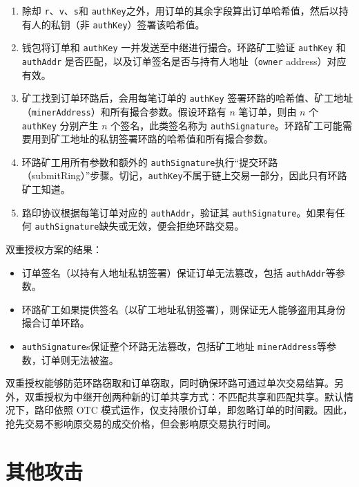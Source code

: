 \documentclass[UTF8,nofonts]{ctexart}%
\begin{document}
\begin{multicols}{2}
\begin{enumerate}
	\item 除却 \verb|r|、\verb|v|、\verb|s|和 \verb|authKey|之外，用订单的其余字段算出订单哈希值，然后以持有人的私钥（非 \verb|authKey|）签署该哈希值。

	\item 钱包将订单和 \verb|authKey| 一并发送至中继进行撮合。环路矿工验证 \verb|authKey| 和 \verb|authAddr| 是否匹配，以及订单签名是否与持有人地址（\verb|owner| address）对应有效。 

	\item 矿工找到订单环路后，会用每笔订单的 \verb|authKey| 签署环路的哈希值、矿工地址（\verb|minerAddress|）和所有撮合参数。假设环路有 $n$ 笔订单，则由 $n$ 个 \verb|authKey| 分别产生 $n$ 个签名，此类签名称为 \verb|authSignature|。环路矿工可能需要用到矿工地址的私钥签署环路的哈希值和所有撮合参数。

	\item 环路矿工用所有参数和额外的 \verb|authSignature|执行“提交环路（submitRing）”步骤。切记，\verb|authKey|不属于链上交易一部分，因此只有环路矿工知道。


	\item 路印协议根据每笔订单对应的 \verb|authAddr|，验证其 \verb|authSignature|。如果有任何 \verb|authSignature|缺失或无效，便会拒绝环路交易。
 
\end{enumerate}

双重授权方案的结果：

\begin{itemize}

	\item  订单签名（以持有人地址私钥签署）保证订单无法篡改，包括 \verb|authAddr|等参数。
	\item  环路矿工如果提供签名（以矿工地址私钥签署），则保证无人能够盗用其身份撮合订单环路。
	\item  \verb|authSignature|s保证整个环路无法篡改，包括矿工地址 \verb|minerAddress|等参数，订单则无法被盗。

\end{itemize}

双重授权能够防范环路窃取和订单窃取，同时确保环路可通过单次交易结算。另外，双重授权为中继开创两种新的订单共享方式：不匹配共享和匹配共享。默认情况下，路印依照 OTC 模式运作，仅支持限价订单，即忽略订单的时间戳。因此，抢先交易不影响原交易的成交价格，但会影响原交易执行时间。

\section{其他攻击}


\end{multicols}
\end{document}
